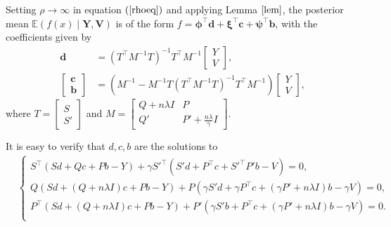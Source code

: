Setting $\rho \rightarrow \infty$ in equation $(\ref{rhoeq})$ and applying Lemma $\ref{lem}$, the posterior mean $\mathbb{E}(f(x)\mid \mathbf{Y},\mathbf{V})$ is of the form $f  = \mathbf{\phi}^\top \mathbf{d}+\mathbf{\xi}^\top \mathbf{c}+\mathbf{\psi}^\top \mathbf{b}$, with the coefficients given by
\begin{align*}
\mathbf{d}&=(T^\top M^{-1}T)^{-1}T^\top M^{-1}\begin{bmatrix}Y\\V \end{bmatrix},\\
\begin{bmatrix}\mathbf{c}\\\mathbf{b}\end{bmatrix} &=
(M^{-1}-M^{-1}T(T^\top M^{-1} T)^{-1}T^\top M^{-1})\begin{bmatrix}Y\\V \end{bmatrix},
\end{align*} where $T=\begin{bmatrix} S\\S' \end{bmatrix}$ and $M=\begin{bmatrix}
Q+n\lambda I& P\\
Q'& P'+\frac{n\lambda}{\gamma}I
\end{bmatrix}$.


It is easy to verify that $d,c,b$ are the solutions to
\begin{align*}
&\begin{cases}
S^\top (Sd +Qc+Pb-Y) +\gamma S'^\top( S'd+ P^\top c+S'^\top P'b-V)=0, \\
Q(Sd+(Q+n\lambda I)c+Pb-Y) + P ( \gamma S'd +  \gamma P^\top c+ (\gamma P'+n\lambda I) b- \gamma V)=0, \\
P^\top (Sd+(Q+n\lambda I) c +Pb-Y)+P'(\gamma S'b+P^\top c +(\gamma P'+n\lambda I)b- \gamma V)=0. \\
\end{cases}
\end{align*}


